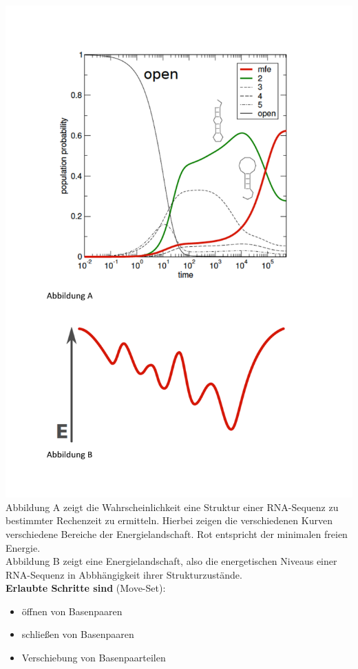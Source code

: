 \includegraphics[scale=0.5]{lectures/160523/pix/Diagramme} \\
Abbildung A zeigt die Wahrscheinlichkeit eine Struktur einer RNA-Sequenz zu bestimmter Rechenzeit zu ermitteln. Hierbei zeigen die verschiedenen Kurven verschiedene Bereiche der Energielandschaft. Rot entspricht der minimalen freien Energie. \\
Abbildung B zeigt eine Energielandschaft, also die energetischen Niveaus einer RNA-Sequenz in Abbhängigkeit ihrer Strukturzustände. \\

\textbf{Erlaubte Schritte sind} (Move-Set): 
\begin{itemize}
\item öffnen von Basenpaaren
\item schließen von Basenpaaren
\item Verschiebung von Basenpaarteilen
\end{itemize}

